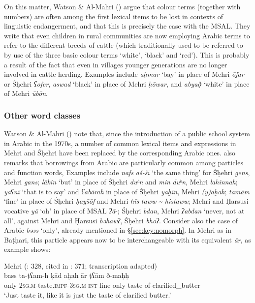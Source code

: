 \documentclass[output=paper]{langsci/langscibook}
\begin{document}
On this matter, Watson \& Al-Mahri (\citeyear[90]{WatsonAl-Mahri2017}) argue that colour terms (together with numbers) are often among the first lexical items to be lost in contexts of linguistic endangerment, and that this is precisely the case with the MSAL. They write that even children in rural communities are now employing Arabic terms to refer to the different breeds of cattle (which traditionally used to be referred to by use of the three basic colour terms ‘white’, ‘black’ and ‘red’). This is probably a result of the fact that even in villages younger generations are no longer involved in cattle herding. Examples include \textit{aḥmar} ‘bay’ in place of Mehri \textit{ōfar} or Śḥehri \textit{ʕofer}, \textit{aswad} ‘black’ in place of Mehri \textit{ḥōwar}, and \textit{abya\d{ð}}̣ ‘white’ in place of Mehri \textit{ūbōn}.


 \subsubsection{Other word classes}

Watson \& Al-Mahri (\citeyear[90]{WatsonAl-Mahri2017}) note that, since the introduction of a public school system in Arabic in the 1970s, a number of common lexical items and expressions in Mehri and Śḥehri have been replaced by the corresponding Arabic ones. \citet{Lonnet2011} also remarks that borrowings from Arabic are particularly common among particles and function words, Examples include \textit{nafs} \textit{aš-šī} ‘the same thing’ for Śḥehri \textit{gens}, Mehri \textit{gans}; \textit{lākin} ‘but’ in place of Śḥehri \textit{duʰn} and \textit{min} \textit{duʰn}, Mehri \textit{lahinnah}; \textit{yaʕnī} ‘that is to say’ and \textit{ʕabārah} in place of Śḥehri \textit{yaḫīn}, Mehri \textit{(y)aḫah}; \textit{tamām} ‘fine’ in place of Śḥehri \textit{ḥay\~{s}ōf} and Mehri \textit{hīs} \textit{taww} \textit{{\textasciitilde} histaww}; Mehri and Ḥarsusi vocative \textit{yā} ‘oh’ in place of MSAL \textit{ʔā}-; Śḥehri \textit{bdan}, Mehri \textit{ʔabdan} ‘never, not at all’, against Mehri and Ḥarsusi \textit{bəhawʔ}, Śḥehri \textit{bhoʔ}. Consider also the case of Arabic \textit{bəss} ‘only’, already mentioned in §\ref{sec:key:nomorph}. In Mehri as in Baṭḥari, this particle appears now to be interchangeable with its equivalent \textit{ār}, as example  shows:

\ea\label{ex:key:sima}
{Mehri (\citealt{Sima2009}: 328, cited in \citealt{Watson2012}: 371; transcription adapted)}\\
\gll bass ta-ṭʕam-h ḳād aḫah ār ṭʕām ð-maḥḥ\\
     only 2\textsc{sg.m}-taste.\textsc{impf-3sg.m} \textsc{int} fine only taste of-clarified\_butter\\
\glt `Just taste it, like it is just the taste of clarified butter.' 
\z
\end{document}
